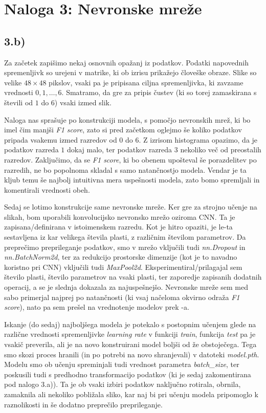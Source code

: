 \documentclass{article}
\begin{document}
\section*{Naloga 3: Nevronske mreže}
\subsection*{3.b)}

Za začetek zapišimo nekaj osnovnih opažanj iz podatkov. Podatki napovednih spremenljivk so urejeni v matrike, ki ob izrisu prikažejo človeške obraze. 
Slike so velike $48 \times 48$ pikslov, vsaki pa je pripisana ciljna spremenljivka, ki zavzame vrednosti ${0, 1, \dots, 6}$. Smatramo, da gre za pripis čustev (ki so torej zamaskirana s števili od $1$ do $6$) vsaki izmed slik. 

Naloga nas sprašuje po konstrukciji modela, s pomočjo nevronskih mrež, ki bo imel čim manjši \textit{F1 score}, zato si pred začetkom oglejmo še koliko podatkov pripada vsakemu izmed razredov od $0$ do $6$. 
Z izrisom histograma opazimo, da je podatkov razreda $1$ dokaj malo, ter podatkov razreda $3$ nekoliko več od preostalih razredov. Zaključimo, da se \textit{F1 score}, ki bo obenem upošteval še porazdelitev po razredih, ne bo popolnoma skladal s samo natančnostjo modela. 
Vendar je ta kljub temu še najbolj intuitivna mera uspešnosti modela, zato bomo spremljali in komentirali vrednosti obeh. 

Sedaj se lotimo konstrukcije same nevronske mreže. Ker gre za strojno učenje na slikah, bom uporabili konvolucijsko nevronsko mrežo oziroma CNN. 
Ta je zapisana/definirana v istoimenskem razredu. Kot je hitro opaziti, je le-ta sestavljena iz kar velikega števila plasti, z različnim številom parametrov. 
Da preprečimo preprileganje podatkov, smo v mrežo vključili tudi \textit{nn.Dropout} in \textit{nn.BatchNorm2d}, ter za redukcijo prostorske dimenzije (kot je to navadno koristno pri CNN) vključili tudi \textit{MaxPool2d}.
Eksperimentiral/prilagajal sem število plasti, število parametrov na vsaki plasti, ter zaporedje zapisanih dodatnih operacij, a se je slednja dokazala za najuspešnejšo. 
Nevronske mreže sem med sabo primerjal najprej po natančnosti (ki vsaj načeloma okvirno odraža \textit{F1 score}), nato pa sem prešel na vrednotenje modelov prek -a. 

Iskanje (do sedaj) najboljšega modela je potekalo s postopnim učenjem glede na različne vrednosti spremenljivke \textit{learning rate} v funkciji \textit{train}, funkcija \textit{test} pa je vsakič preverila, ali je na novo konstruirani model boljši od že obstoječega.
Tega smo skozi proces hranili (in po potrebi na novo shranjevali) v datoteki \textit{model.pth}. Modelu smo ob učenju spreminjali tudi vrednost parametra \textit{batch\_size}, ter poskusili tudi s predhodno transformacijo podatkov (ki je sedaj zakomentirana pod nalogo 3.a)). 
Ta je ob vsaki izbiri podatkov naključno rotirala, obrnila, zamaknila ali nekoliko pobližala sliko, kar naj bi pri učenju modela pripomoglo k raznolikosti in še dodatno preprečilo preprileganje.
\end{document}
